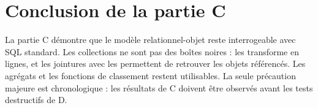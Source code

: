 \section{Conclusion de la partie C}

La partie C démontre que le modèle relationnel-objet reste interrogeable avec
SQL standard. Les collections ne sont pas des boîtes noires : 
les transforme en lignes, et les jointures avec les  permettent de
retrouver les objets référencés. Les agrégats et les fonctions de classement
restent utilisables. La seule précaution majeure est chronologique : les
résultats de C doivent être observés avant les tests destructifs de D.

